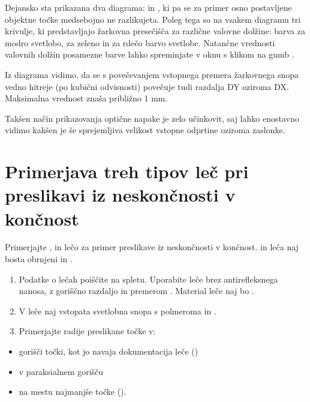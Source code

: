 \documentclass[letterpaper,10pt,english]{sphinxmanual}
\begin{document}
\sphinxAtStartPar
Dejansko sta prikazana dva diagrama:  in , ki pa se za primer osno postavljene objektne točke medsebojno ne razlikujeta. Poleg tega so na vsakem diagramu tri krivulje, ki predstavljajo žarkovna presečišča za različne valovne dolžine:  barva za modro svetlobo,  za zeleno in  za rdečo barvo svetlobe. Natančne vrednosti valovnih dolžin posamezne barve lahko spreminjate v oknu  s klikom na gumb .

\sphinxAtStartPar
Iz diagrama vidimo, da se s povečevanjem vstopnega premera žarkovnega snopa vedno hitreje (po kubični odvisnosti) povečuje tudi razdalja DY oziroma DX. Maksimalna vrednost znaša približno 1 mm.

\sphinxAtStartPar
Takšen način prikazovanja optične napake je zelo učinkovit, saj lahko enostavno vidimo kakšen je še sprejemljiva velikost vstopne odprtine oziroma zaslonke.


\section{Primerjava treh tipov leč pri preslikavi iz neskončnosti v končnost}
\label{\detokenize{oslo:primerjava-treh-tipov-lec-pri-preslikavi-iz-neskoncnosti-v-koncnost}}
\sphinxAtStartPar
Primerjajte ,  in  lečo za primer preslikave iz neskončnosti v končnost.  in  leča naj bosta obrnjeni  in .
\begin{enumerate}
%
\item {} 
\sphinxAtStartPar
Podatke o lečah poiščite na spletu. Uporabite leče brez antirefleksnega nanosa, z goriščno razdaljo \sphinxstylestrong{50 mm} in premerom . Material leče naj bo .

\item {} 
\sphinxAtStartPar
V leče naj vstopata svetlobna snopa s polmeroma \sphinxstylestrong{2 mm} in \sphinxstylestrong{10 mm}.

\item {} 
\sphinxAtStartPar
Primerjajte radije preslikane točke v:

\end{enumerate}
\begin{itemize}
\item {} 
\sphinxAtStartPar
gorišči točki, kot jo navaja dokumentacija leče ()

\item {} 
\sphinxAtStartPar
v paraksialnem gorišču

\item {} 
\sphinxAtStartPar
na mestu najmanjše točke ().

\end{itemize}
\end{document}
